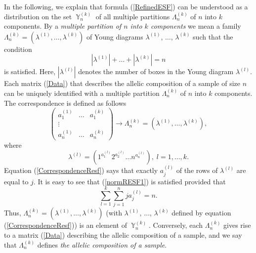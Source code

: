 \documentclass[12pt]{amsart}
\theoremstyle{definition}
\numberwithin{equation}{section}
\DeclareMathOperator{\Y}{\mathbb{Y}}
\begin{document}
In the following, we explain that formula (\ref{RefinedESF}) can be understood as a distribution on the set $\Y_n^{(k)}$ of all multiple
partitions $\Lambda_n^{(k)}$ of $n$ into $k$ components. By a \textit{multiple partition of $n$ into $k$ components} we mean a family $\Lambda_n^{(k)}=\left(\lambda^{(1)},\ldots,\lambda^{(k)}\right)$ of Young diagrams
$\lambda^{(1)}$, $\ldots$, $\lambda^{(k)}$ such that the condition
\begin{equation}\label{normRESF1}
|\lambda^{(1)}|+\ldots+|\lambda^{(k)}|=n
\end{equation}
is satisfied. Here, $|\lambda^{(l)}|$ denotes the number of boxes in the Young diagram $\lambda^{(l)}$. Each matrix (\ref{Data}) that describes the allelic composition of a sample of size $n$ can be uniquely identified with
a multiple partition $\Lambda_n^{(k)}$ of $n$ into $k$ components. The
correspondence is defined as follows
\begin{equation}\label{DataPartition}
\left(
\begin{array}{ccc}
  a_1^{(1)} & \ldots & a_1^{(k)} \\
  \vdots &  &  \\
  a_n^{(1)} & \ldots & a_n^{(k)}
\end{array}
\right)\longrightarrow \Lambda_n^{(k)}=\left(\lambda^{(1)},\ldots,\lambda^{(k)}\right),
\end{equation}
where
\begin{equation}\label{CorrespondenceResf}
\lambda^{(l)}=\left(1^{a_1^{(l)}}2^{a_2^{(l)}}\ldots n^{a_n^{(l)}}\right),\; l=1,\ldots,k.
\end{equation}
Equation (\ref{CorrespondenceResf}) says that exactly $a_j^{(l)}$ of the rows of $\lambda^{(l)}$ are equal to $j$. It is easy to see that (\ref{normRESF1}) is satisfied provided that
\begin{equation}\label{ConditionMatrix}
\sum\limits_{l=1}^{k}\sum\limits_{j=1}^nja_j^{(l)}=n.
\end{equation}
Thus, $\Lambda_n^{(k)}=\left(\lambda^{(1)},\ldots,\lambda^{(k)}\right)$ (with $\lambda^{(1)}$,
$\ldots$, $\lambda^{(k)}$ defined by equation (\ref{CorrespondenceResf})) is an element of $\Y_n^{(k)}$. Conversely, each $\Lambda_n^{(k)}$  gives rise
to a matrix (\ref{Data}) describing the allelic composition of a sample,
and we say that $\Lambda_n^{(k)}$ defines \textit{the allelic composition of a sample}.
\end{document}
